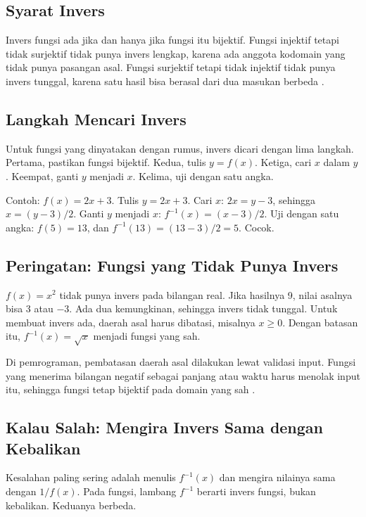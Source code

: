 \documentclass[11pt,a4paper]{article}
\begin{document}
\subsection{Syarat Invers}

Invers fungsi ada jika dan hanya jika fungsi itu bijektif. Fungsi injektif tetapi tidak surjektif tidak punya invers lengkap, karena ada anggota kodomain yang tidak punya pasangan asal. Fungsi surjektif tetapi tidak injektif tidak punya invers tunggal, karena satu hasil bisa berasal dari dua masukan berbeda \cite{rosen}.

\subsection{Langkah Mencari Invers}

Untuk fungsi yang dinyatakan dengan rumus, invers dicari dengan lima langkah. Pertama, pastikan fungsi bijektif. Kedua, tulis $y=f(x)$. Ketiga, cari $x$ dalam $y$. Keempat, ganti $y$ menjadi $x$. Kelima, uji dengan satu angka.

Contoh: $f(x)=2x+3$. Tulis $y=2x+3$. Cari $x$: $2x=y-3$, sehingga $x=(y-3)/2$. Ganti $y$ menjadi $x$: $f^{-1}(x)=(x-3)/2$. Uji dengan satu angka: $f(5)=13$, dan $f^{-1}(13)=(13-3)/2=5$. Cocok.

\subsection{Peringatan: Fungsi yang Tidak Punya Invers}

$f(x)=x^2$ tidak punya invers pada bilangan real. Jika hasilnya 9, nilai asalnya bisa 3 atau $-3$. Ada dua kemungkinan, sehingga invers tidak tunggal. Untuk membuat invers ada, daerah asal harus dibatasi, misalnya $x \ge 0$. Dengan batasan itu, $f^{-1}(x)=\sqrt{x}$ menjadi fungsi yang sah.

Di pemrograman, pembatasan daerah asal dilakukan lewat validasi input. Fungsi yang menerima bilangan negatif sebagai panjang atau waktu harus menolak input itu, sehingga fungsi tetap bijektif pada domain yang sah \cite{kleppmann}.

\subsection{Kalau Salah: Mengira Invers Sama dengan Kebalikan}

Kesalahan paling sering adalah menulis $f^{-1}(x)$ dan mengira nilainya sama dengan $1/f(x)$. Pada fungsi, lambang $f^{-1}$ berarti invers fungsi, bukan kebalikan. Keduanya berbeda.
\end{document}
